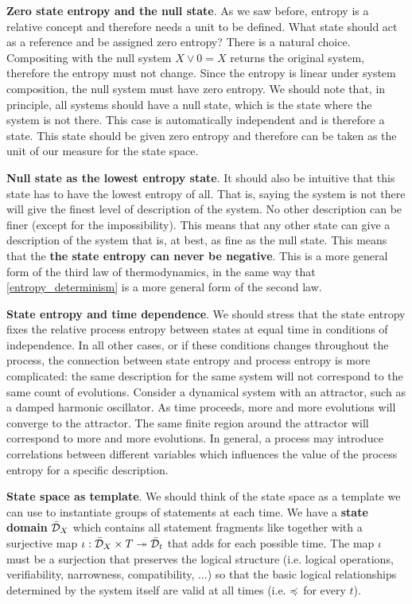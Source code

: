 \documentclass[10pt, onecolumn, longbibliography, nofootinbib]{revtex4-2}
\begin{document}
\textbf{Zero state entropy and the null state}. As we saw before, entropy is a relative concept and therefore needs a unit to be defined. What state should act as a reference and be assigned zero entropy? There is a natural choice. Compositing with the null system $X \vee 0 = X$ returns the original system, therefore the entropy must not change. Since the entropy is linear under system composition, the null system must have zero entropy. We should note that, in principle, all systems should have a null state, which is the state where the system is not there. This case is automatically independent and is therefore a state. This state should be given zero entropy and therefore can be taken as the unit of our measure for the state space.

\textbf{Null state as the lowest entropy state}. It should also be intuitive that this state has to have the lowest entropy of all. That is, saying the system is not there will give the finest level of description of the system. No other description can be finer (except for the impossibility). This means that any other state can give a description of the system that is, at best, as fine as the null state. This means that the \textbf{the state entropy can never be negative}. This is a more general form of the third law of thermodynamics, in the same way that \ref{entropy_determinism} is a more general form of the second law.

\textbf{State entropy and time dependence}. We should stress that the state entropy fixes the relative process entropy between states at equal time in conditions of independence. In all other cases, or if these conditions changes throughout the process, the connection between state entropy and process entropy is more complicated: the same description for the same system will not correspond to the same count of evolutions. Consider a dynamical system with an attractor, such as a damped harmonic oscillator. As time proceeds, more and more evolutions will converge to the attractor. The same finite region around the attractor will correspond to more and more evolutions. In general, a process may introduce correlations between different variables which influences the value of the process entropy for a specific description.

\textbf{State space as template}. We should think of the state space as a template we can use to instantiate groups of statements at each time. We have a \textbf{state domain} $\bar{\mathcal{D}}_{X}$ which contains all statement fragments like  together with a surjective map $\iota : \bar{\mathcal{D}}_{X} \times T \twoheadrightarrow \bar{\mathcal{D}}_t$ that adds  for each possible time. The map $\iota$ must be a surjection that preserves the logical structure (i.e. logical operations, verifiability, narrowness, compatibility, ...) so that the basic logical relationships determined by the system itself are valid at all times (i.e.  $\preccurlyeq$  for every $t$).
\end{document}
